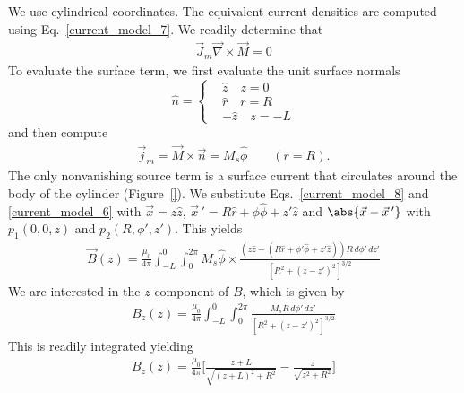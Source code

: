 \documentclass[12pt,a4paper,oneside]{book}
\begin{document}
\begin{onehalfspace}
\begin{example}
We use cylindrical coordinates. The equivalent current densities are computed using Eq.~\eqref{current_model_7}. We readily determine that 
\begin{equation}\label{current_model_8}
\begin{aligned}
	\vec{J}_m \vec{\nabla} \times \vec{M}= 0
\end{aligned}
\end{equation}
To evaluate the surface term, we first evaluate the unit surface normals 
\begin{equation*}\label{}
	\hat{n}=\left\lbrace 
	\begin{aligned}
		&\hat{z}\quad z=0 \\[6pt]	
		&\hat{r}\quad r=R \\[6pt]	
		&-\hat{z}\quad z=-L 
	\end{aligned}\right. 
\end{equation*}
and then compute
\begin{equation}\label{current_model_9}
	\begin{aligned}
		\vec{j}_m = \vec{M} \times \vec{n}= M_s\hat{\phi}\qquad(r=R).
	\end{aligned}
\end{equation}
The only nonvanishing source term is a surface current that circulates around the body of the cylinder (Figure~\ref{}). We substitute Eqs.~\eqref{current_model_8} and \ref{current_model_6} with $\vec{x}=z\hat{z}$, $\vec{x}\,'=R\hat{r}+\phi\hat{\phi}+z'\hat{z}$ and $\abs{\vec{x}-\vec{x}\,'}$ with $p_1(0,0,z)$ and $p_2(R,\phi',z')$. This yields
\begin{equation*}\label{}
	\begin{aligned}
		\vec{B}(z) = \frac{\mu_0}{4\pi}\int_{-L}^{0}\int_{0}^{2\pi} M_s\hat{\phi}\times\frac{(z\hat{z}-(R\hat{r}+\phi'\hat{\phi}+z'\hat{z}))R\,d\phi'\,dz'}{[R^2+(z-z')^2]^{3/2}}
	\end{aligned}
\end{equation*}
We are interested in the $z$-component of $B$, which is given by
\begin{equation*}\label{}
	\begin{aligned}
		{B}_z(z) = \frac{\mu_0}{4\pi}\int_{-L}^{0}\int_{0}^{2\pi} \frac{M_sR\,d\phi'\,dz'}{[R^2+(z-z')^2]^{3/2}}
	\end{aligned}
\end{equation*}
This is readily integrated yielding 
\begin{equation}\label{current_model_10}
	\begin{aligned}
		{B}_z(z) = \frac{\mu_0}{4\pi}\Bigg[\frac{z+L}{\sqrt{(z+L)^2+R^2}}-\frac{z}{\sqrt{z^2+R^2}}\Bigg]

\end{aligned}
\end{equation}
\end{example}
\end{onehalfspace}
\end{document}
